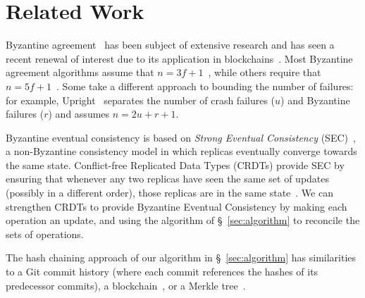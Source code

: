 \documentclass[manuscript,anonymous]{acmart}
\begin{document}
\section{Related Work}

Byzantine agreement~\cite{Lamport:1982} has been subject of extensive research and has seen a recent renewal of interest due to its application in blockchains~\cite{Bano:2019}.
Most Byzantine agreement algorithms assume that $n=3f+1$~\cite{Castro:1999,Cowling:2006,Kotla:2007,Aublin:2015,Yin:2019}, while others require that $n=5f+1$~\cite{Abd:2005,Martin:2006}.
Some take a different approach to bounding the number of failures: for example, Upright~\cite{Clement:2009} separates the number of crash failures ($u$) and Byzantine failures ($r$) and assumes $n=2u+r+1$.


Byzantine eventual consistency is based on \emph{Strong Eventual Consistency} (SEC)~\cite{Shapiro:2011un}, a non-Byzantine consistency model in which replicas eventually converge towards the same state.
Conflict-free Replicated Data Types (CRDTs) provide SEC by ensuring that whenever any two replicas have seen the same set of updates (possibly in a different order), those replicas are in the same state~\cite{Shapiro:2011un}.
We can strengthen CRDTs to provide Byzantine Eventual Consistency by making each operation an update, and using the algorithm of \S~\ref{sec:algorithm} to reconcile the sets of operations.

The hash chaining approach of our algorithm in \S~\ref{sec:algorithm} has similarities to a Git commit history (where each commit references the hashes of its predecessor commits), a blockchain~\cite{Bano:2019}, or a Merkle tree~\cite{Merkle:1987}.



\end{document}

